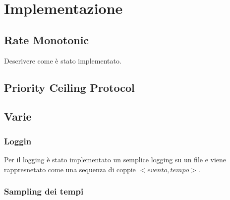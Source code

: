 \chapter{Implementazione}

\section{Rate Monotonic}
Descrivere come è stato implementato.

\section{Priority Ceiling Protocol}

\section{Varie}

\subsection{Loggin}
Per il logging è stato implementato un semplice logging su un file e viene rappresnetato come una sequenza di coppie $<evento,tempo>$.

\subsection{Sampling dei tempi}